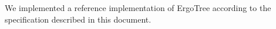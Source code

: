 \documentclass[11pt]{article}
\newcommand{\ASDag}{ErgoTree\xspace}
\begin{document}
We implemented a reference implementation of \ASDag according to the specification
described in this document.

















\appendix






\end{document}
